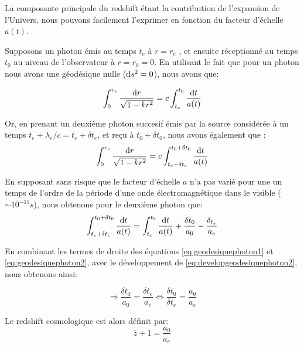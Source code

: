 \documentclass[../main/main.tex]{subfiles}
\begin{document}
La composante principale du redshift étant la contribution de
l'expansion de l'Univers, nous pouvons facilement l'exprimer en fonction
du facteur d'échelle $a(t)$.

Supposons un photon émis au temps $t_{e}$ à $r = r_{e}$ , et ensuite réceptionné au temps $t_{0}$
au niveau de l’observateur à $r = r_{0} = 0$.
En utilisant le fait que pour un photon nous avons une géodésique nulle
($\mathrm{d} s^{2}=0$), nous avons que:

\begin{equation}
  \label{eq:geodesiquephoton1}
  \int_{0}^{r_{e}} \frac{\mathrm{d} r}{\sqrt{1-kr^{2}}}=c\int_{t_{e}}^{t_{0}}\frac{\mathrm{d} t}{a(t)}
\end{equation}

Or, en prenant un deuxième photon succesif émis par la source considérée
à un temps $t_{e}+\lambda_{e}/c=t_{e}+\delta t_{e}$, et reçu à
$t_{0}+\delta t_{0}$, nous avons également que :
\begin{equation}
  \label{eq:geodesiquephoton2}
  \int_{0}^{r_{e}} \frac{\mathrm{d} r}{\sqrt{1-kr^{2}}}=c\int_{t_{e}+\delta t_{e}}^{t_{0}+\delta t_{0}}\frac{\mathrm{d} t}{a(t)}
\end{equation}

En supposant sans risque que le facteur d'échelle $a$ n'a pas varié pour
une un temps de l'ordre de la période d'une onde électromagnétique dans
le visible ($\sim10^{-15}s$), nous obtenons pour le deuxième photon que:
\begin{equation}
  \label{eq:developgeodesiquephoton2}
  \int_{t_{e}+\delta t_{e}}^{t_{0}+\delta t_{0}}\frac{\mathrm{d} t}{a(t)} =
  \int_{t_{e}}^{t_{0}}\frac{\mathrm{d} t}{a(t)} + \frac{\delta t_{0}}{a_{0}} - \frac{\delta_{t_{e}}}{a_{e}}
\end{equation}

En combinant les termes de droite des équations
\ref{eq:geodesiquephoton1} et \ref{eq:geodesiquephoton2}, avec le
développement de \ref{eq:developgeodesiquephoton2}, nous obtenons ainsi:

\begin{equation*}
  \Rightarrow \frac{\delta t_{0}}{a_{0}} = \frac{\delta t_{e}}{a_{e}}
  \Leftrightarrow \frac{\delta t_{0}}{\delta t_{e}} = \frac{a_{0}}{a_{e}}
\end{equation*}

Le redshift cosmologique est alors définit par:
\begin{equation}
  \label{eq:zcosmo}
  \bar{z}+1=\frac{a_{0}}{a_{e}}
\end{equation}
\end{document}
